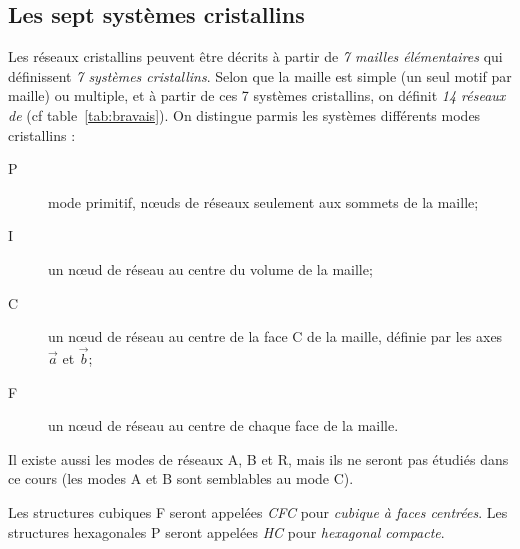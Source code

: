 \subsection{Les sept systèmes cristallins}
Les réseaux cristallins peuvent être décrits à partir de \emph{7 mailles
élémentaires} qui définissent \emph{7 systèmes cristallins}.
Selon que la maille est simple (un seul motif par maille) ou multiple, et à
partir de ces 7 systèmes cristallins, on définit
\emph{14 réseaux de } (cf table~\ref{tab:bravais}). On distingue
parmis les systèmes différents modes cristallins :
\begin{description}
    \item[P]  mode primitif, n\oe uds de réseaux seulement aux sommets de la 
        maille;
    \item[I] un n\oe ud de réseau au centre du volume de la maille;
    \item[C] un n\oe ud de réseau au centre de la face C de la maille, définie par 
        les axes $\vec{a}$ et $\vec{b}$;
    \item[F] un n\oe ud de réseau au centre de chaque face de la maille.
\end{description}
\begin{rem}
    Il existe aussi les modes de réseaux A, B et R, mais ils ne seront pas étudiés
    dans ce cours (les modes A et B sont semblables au mode C).
\end{rem}
\begin{rem}
    Les structures cubiques F seront appelées \emph{CFC} pour \emph{cubique à
    faces centrées}. Les structures hexagonales P seront appelées \emph{HC}
    pour \emph{hexagonal compacte}.
\end{rem}

